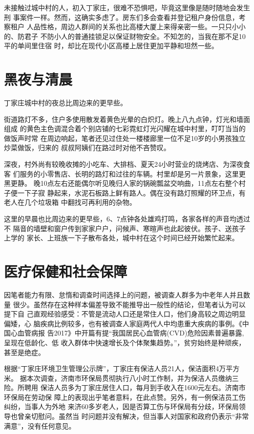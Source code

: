 未接触过城中村的人，初入丁家庄，很难不恐惧吧，毕竟这里像是随时随地会发生刑
事案件一样。然而，这确实多虑了。房东们多会查看并登记租户身份信息，考察租户
人品性格，周边人群间的关系也比高楼大厦上来得亲密一些。一只只小小的、防君子
不防小人的普通挂锁足以保证财物安全。不知怎的，当我在那不足10平的单间里住宿
时，却比在现代小区高楼上居住更加平静和坦然一些。

\section{黑夜与清晨}

丁家庄城中村的夜总比周边来的更早些。

街道路灯不多，住户多使用散发着黄色光晕的白炽灯。晚上八九点钟，灯光和墙面组成
的黄色主色调混合着个别店铺的七彩霓虹灯光闪耀在城中村里，叮叮当当的做饭声时常
在周边响起，笔者还见过住处一楼楼廊里一位不足10岁的小男孩独立炒菜做饭，归来的
叔叔阿姨们在路过时对他不吝赞叹。

深夜，村外尚有较晚收摊的小吃车、大排档、夏天24小时营业的烧烤店、为深夜食客
们服务的小零售店、长明的路灯和过往的车辆。村里却是另一片景象，这里更黑更静。
晚10点左右还能偶尔听见晚归人家的锅碗瓢盆交响曲，11点左右整个村子便一下子寂
静起来，水泥石板路上鲜有路人。偶在没有路灯照耀的环卫点，有老人在几个垃圾箱
中翻找可再利用的杂物。

这里的早晨也比周边来的更早些，6、7点钟各处雄鸡打鸣，各家各样的声音均透过不
隔音的墙壁和窗户传到家家户户，问候声、寒暄声也此起彼伏。孩子、送孩子上学的
家长、上班族一下子散布各处，城中村在这个时间已经开始繁忙起来。

\section{医疗保健和社会保障}

因笔者能力有限、怠惰和调查时间选择上的问题，被调查人群多为中老年人并且数量
很少。虽然存在这种样本偏差导致不能推导出一般性的结论，但笔者认为可以提下自
己直观经验感受：不管是流动人口还是常住人口，他们身高较之周边明显偏矮，心
脑疾病比例较多，也有被调查人家庭两代人中均患重大疾病的事例。《中国心血管病报
告2017》中开篇有提“我国居民心血管病(CVD)危险因素普遍暴露,呈现在低龄化、低
收入群体中快速增长及个体聚集趋势。”，贫穷始终是种顽疾，甚至是绝症。

根据“丁家庄环境卫生管理公示牌”，丁家庄有保洁人员21人，保洁面积4万平方米。
据本次调查，济南市环保局贯彻执行八小时工作制，并为保洁人员缴纳三险。所聘用
保洁人员多为丁家庄居住人口，每月到手收入在1600元左右。济南市环保局在劳动保
障上的表现出乎笔者意料，在此点赞。另外，有一例保洁员工伤纠纷，当事人为外地
来济60多岁老人，因是否算工伤与环保局有分歧，环保局领导也曾亲切慰问。虽然当
时问题并没有解决，但当事人对国家和政府仍表示“非常满意”，没有任何意见。

